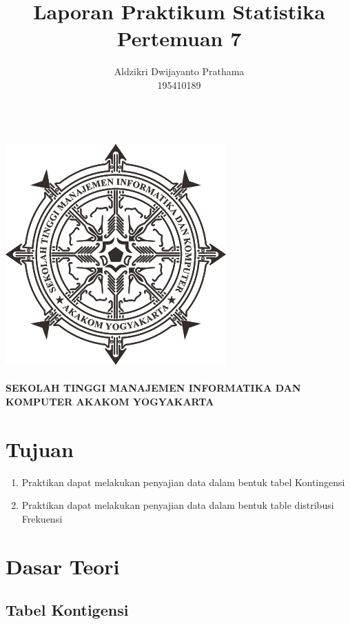 \documentclass[a4paper,12pt]{article}
\begin{document}
\title{Laporan Praktikum Statistika Pertemuan 7}
\author{Aldzikri Dwijayanto Prathama 
	\\195410189}
\makeatletter
\begin{titlepage}
	\begin{center}
		{\huge \bfseries \@title }\\[14ex]
		\includegraphics[scale=.8]{logo}\\[4ex]
		{\large \@author}\\[20ex]
		{\large \bfseries {SEKOLAH TINGGI MANAJEMEN INFORMATIKA DAN KOMPUTER
				AKAKOM YOGYAKARTA}}
	\end{center}


\end{titlepage}
\makeatother
\newpage
\section{Tujuan}
\begin{enumerate}
	\item Praktikan dapat melakukan penyajian data dalam bentuk tabel Kontingensi
	\item Praktikan dapat melakukan penyajian data dalam bentuk table distribusi Frekuensi
\end{enumerate}
\section{Dasar Teori}
\subsection{Tabel Kontigensi}
\end{document}
